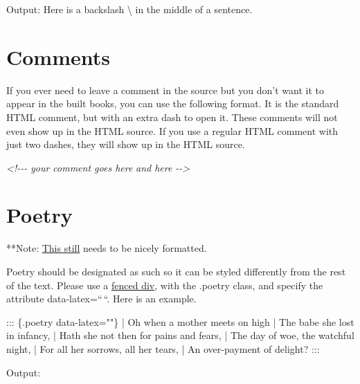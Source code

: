 \documentclass[
]{book}
\newenvironment{Shaded}{\begin{snugshade}}{\end{snugshade}}
\newcommand{\CommentTok}[1]{\textcolor[rgb]{0.56,0.35,0.01}{\textit{#1}}}
\newcommand{\NormalTok}[1]{#1}
\begin{document}
Output: Here is a backslash \textbackslash{} in the middle of a sentence.

\hypertarget{comments}{%
\chapter{Comments}\label{comments}}

If you ever need to leave a comment in the source but you don't want it to appear in the built books, you can use the following format. It is the standard HTML comment, but with an extra dash to open it. These comments will not even show up in the HTML source. If you use a regular HTML comment with just two dashes, they will show up in the HTML source.

\begin{Shaded}
\begin{Highlighting}[]
\CommentTok{\textless{}!{-}{-}{-}}
\CommentTok{your comment goes here}
\CommentTok{and here}
\CommentTok{{-}{-}\textgreater{}}
\end{Highlighting}
\end{Shaded}

\hypertarget{poetry}{%
\chapter{Poetry}\label{poetry}}

**Note: \href{https://github.com/warhornmedia/classics-documentation/issues/4}{This still} needs to be nicely formatted.

Poetry should be designated as such so it can be styled differently from the rest of the text. Please use a \href{https://pandoc.org/MANUAL.html\#divs-and-spans}{fenced div}, with the .poetry class, and specify the attribute data-latex=``\,``. Here is an example.

\begin{Shaded}
\begin{Highlighting}[]
\NormalTok{::: \{.poetry data{-}latex=""\}}
\NormalTok{| Oh when a mother meets on high}
\NormalTok{| The babe she lost in infancy,}
\NormalTok{| Hath she not then for pains and fears,}
\NormalTok{|     The day of woe, the watchful night,}
\NormalTok{| For all her sorrows, all her tears,}
\NormalTok{|     An over{-}payment of delight?}
\NormalTok{:::}
\end{Highlighting}
\end{Shaded}

Output:
\end{document}
